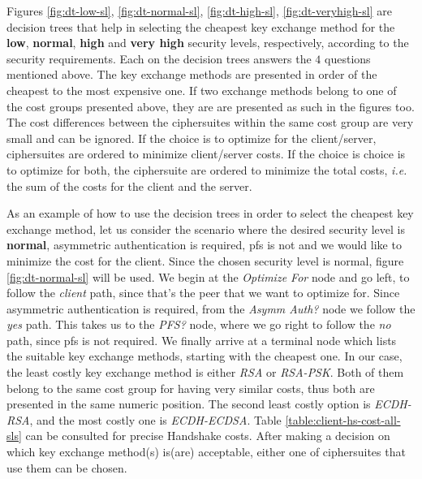 Figures \ref{fig:dt-low-sl}, \ref{fig:dt-normal-sl}, \ref{fig:dt-high-sl}, \ref{fig:dt-veryhigh-sl} are decision trees that
help in selecting the cheapest key exchange method for the \textbf{low}, \textbf{normal}, \textbf{high} and \textbf{very high}
security levels, respectively, according to the security requirements. Each on the decision trees answers the $4$ questions
mentioned above. The key exchange methods are presented in order of the cheapest to the most expensive one. If two exchange methods
belong to one of the cost groups presented above, they are are presented as such in the figures too. The cost differences between
the ciphersuites within the same cost group are very small and can be ignored. If the choice is to optimize for the client/server,
ciphersuites are ordered to minimize client/server costs. If the choice is choice is to optimize for both, the
ciphersuite are ordered to minimize the total costs, \textit{i.e.} the sum of the costs for the client and the server.

As an example of how to use the decision trees in order to select the cheapest key exchange method, let us consider the scenario
where the desired security level is \textbf{normal}, asymmetric authentication is required, \gls{pfs} is not and we would like to
minimize the cost for the client. Since the chosen security level is normal, figure \ref{fig:dt-normal-sl} will be used.
We begin at the \textit{Optimize For} node and go left, to follow the \textit{client} path, since that's the peer that we
want to optimize for. Since asymmetric authentication is required, from the \textit{Asymm Auth?} node we follow the \textit{yes}
path. This takes us to the \textit{PFS?} node, where we go right to follow the \textit{no} path, since \gls{pfs} is not required.
We finally arrive at a terminal node which lists the suitable key exchange methods, starting with the cheapest one.
In our case, the least costly key exchange method is either \textit{RSA} or \textit{RSA-PSK}. Both of them belong to the same
cost group for having very similar costs, thus both are presented in the same numeric position. The second least costly option
is \textit{ECDH-RSA}, and the most costly one is \textit{ECDH-ECDSA}. Table \ref{table:client-hs-cost-all-sls} can be consulted for
precise Handshake costs. After making a decision on which key exchange method(s) is(are) acceptable, either one of ciphersuites that
use them can be chosen.

